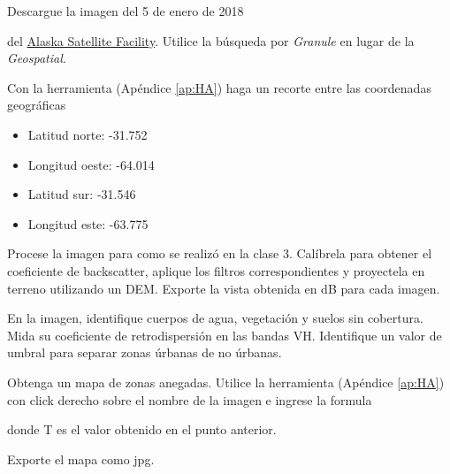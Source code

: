 \begin{que}
    Descargue la imagen del 5 de enero de 2018
    \begin{center}\end{center}
      del \href{https://vertex.daac.asf.alaska.edu/}{Alaska Satellite Facility}. Utilice la búsqueda por \emph{Granule} en lugar de la \emph{Geospatial}.
\end{que}

\begin{que}
    Con la herramienta  (Apéndice \ref{ap:HA}) haga un recorte entre las coordenadas geográficas
    \begin{itemize}
        \item Latitud norte: -31.752
        \item Longitud oeste: -64.014
        \item Latitud sur: -31.546
        \item Longitud este: -63.775
    \end{itemize}
\end{que}

\begin{que}
    Procese la imagen para como se realizó en la clase 3. Calíbrela para obtener el coeficiente de backscatter, aplique los filtros correspondientes y proyectela en terreno utilizando un DEM. Exporte la vista obtenida en dB para cada imagen.
\end{que}

\begin{que}
    En la imagen, identifique cuerpos de agua, vegetación y suelos sin cobertura. Mida su coeficiente de retrodispersión en las bandas VH. Identifique un valor de umbral para separar zonas úrbanas de no úrbanas.
\end{que}

\begin{que}
  Obtenga un mapa de zonas anegadas. Utilice la herramienta  (Apéndice \ref{ap:HA}) con click derecho sobre el nombre de la imagen e ingrese la formula
  \begin{center}
  \end{center}
  donde T es el valor obtenido en el punto anterior.
\end{que}

\begin{que}
    Exporte el mapa como jpg.
\end{que}

